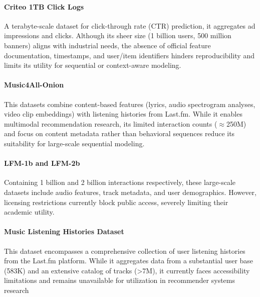 \documentclass[sigconf,authorversion,nonacm]{acmart}
\begin{document}
\paragraph{Criteo 1TB Click Logs}

A terabyte-scale dataset for click-through rate (CTR) prediction, it aggregates ad impressions and clicks.
Although its sheer size (1 billion users, 500 million banners) aligns with industrial needs, the absence of official feature documentation, timestamps, and user/item identifiers hinders reproducibility and limits its utility for sequential or context-aware modeling.

\paragraph{Music4All-Onion}

This datasets combine content-based features (lyrics, audio spectrogram analyses, video clip embeddings) with listening histories from Last.fm.
While it enables multimodal recommendation research, its limited interaction counts ($\approx$250M) and focus on content metadata rather than behavioral sequences reduce its suitability for large-scale sequential modeling.

\paragraph{LFM-1b and LFM-2b \cite{schedl2022lfm}}

Containing 1 billion and 2 billion interactions respectively, these large-scale datasets include audio features, track metadata, and user demographics.
However, licensing restrictions currently block public access, severely limiting their academic utility.

\paragraph{Music Listening Histories Dataset \cite{vigliensoni2017music}}

This dataset encompasses a comprehensive collection of user listening histories from the Last.fm platform.
While it aggregates data from a substantial user base (583K) and an extensive catalog of tracks (>7M), it currently faces accessibility limitations and remains unavailable for utilization in recommender systems research
\end{document}
